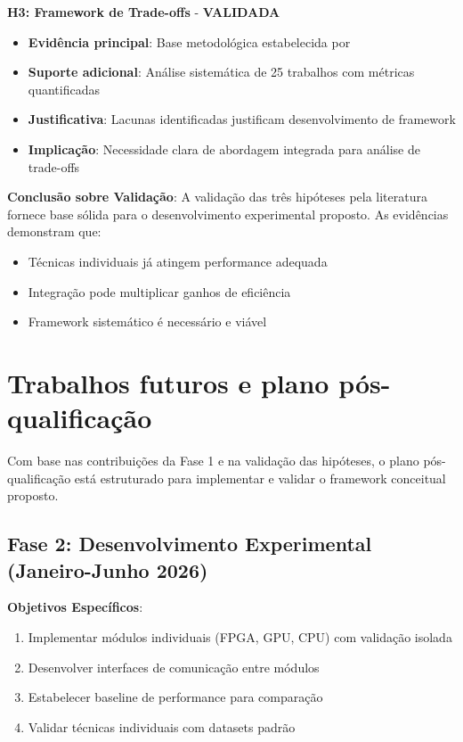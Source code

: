 \textbf{H3: Framework de Trade-offs} - \textbf{VALIDADA}
\begin{itemize}
    \item \textbf{Evidência principal}: Base metodológica estabelecida por \textcite{Hwang2011}
    \item \textbf{Suporte adicional}: Análise sistemática de 25 trabalhos com métricas quantificadas
    \item \textbf{Justificativa}: Lacunas identificadas justificam desenvolvimento de framework
    \item \textbf{Implicação}: Necessidade clara de abordagem integrada para análise de trade-offs
\end{itemize}

\textbf{Conclusão sobre Validação}:
A validação das três hipóteses pela literatura fornece base sólida para o desenvolvimento experimental proposto. As evidências demonstram que:
\begin{itemize}
    \item Técnicas individuais já atingem performance adequada
    \item Integração pode multiplicar ganhos de eficiência
    \item Framework sistemático é necessário e viável
\end{itemize}

\section{Trabalhos futuros e plano pós-qualificação}\label{sec:trabalhos_futuros}

Com base nas contribuições da Fase 1 e na validação das hipóteses, o plano pós-qualificação está estruturado para implementar e validar o framework conceitual proposto.

\subsection{Fase 2: Desenvolvimento Experimental (Janeiro-Junho 2026)}\label{subsec:fase2_desenvolvimento_cronograma}

\textbf{Objetivos Específicos}:
\begin{enumerate}
    \item Implementar módulos individuais (FPGA, GPU, CPU) com validação isolada
    \item Desenvolver interfaces de comunicação entre módulos
    \item Estabelecer baseline de performance para comparação
    \item Validar técnicas individuais com datasets padrão
\end{enumerate}

